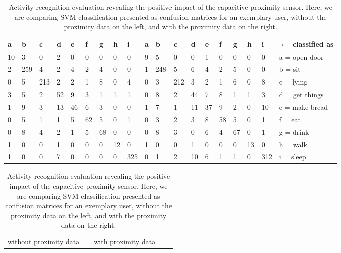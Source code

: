 \documentclass[runningheads,a4paper]{llncs}
\begin{document}
\begin{table}[htbp]
	\centering	\begin{tabular}{p{0.48cm}p{0.48cm}p{0.48cm}p{0.48cm}p{0.48cm}p{0.48cm}p{0.48cm}p{0.48cm}p{0.48cm}|p{0.48cm}p{0.48cm}p{0.48cm}p{0.48cm}p{0.48cm}p{0.48cm}p{0.48cm}p{0.48cm}p{0.48cm}|p{2.2cm}}
a & b & c & d & e & f & g & h & i & a & b & c & d & e & f & g & h & i & $\leftarrow$ classified as\\
\hline
10 & 3 & 0 & 2 & 0 & 0 & 0 & 0 & 0 		& 9 & 5 & 0 & 0 & 1 & 0 & 0 & 0 & 0 & a = open door\\
\hline
2 & 259 & 4 & 2 & 4 & 2 & 4 & 0 & 0 	& 1 & 248 & 5 & 6 & 4 & 2 & 5 & 0 & 0 & b = sit\\
\hline
0 & 5 & 213 & 2 & 2 & 1 & 8 & 0 & 4 	& 0 & 3 & 212 & 3 & 2 & 1 & 6 & 0 & 8 & c = lying\\
\hline
3 & 5 & 2 & 52 & 9 & 3 & 1 & 1 & 1 		& 0 & 8 & 2 & 44 & 7 & 8 & 1 & 1 & 3 & d = get things\\
\hline
1 & 9 & 3 & 13 & 46 & 6 & 3 & 0 & 0 	& 1 & 7 & 1 & 11 & 37 & 9 & 2 & 0 & 10 & e = make bread\\
\hline
0 & 5 & 1 & 1 & 5 & 62 & 5 & 0 & 1 		& 0 & 3 & 2 & 3 & 8 & 58 & 5 & 0 & 1 & f = eat\\
\hline
0 & 8 & 4 & 2 & 1 & 5 & 68 & 0 & 0 		& 0 & 8 & 3 & 0 & 6 & 4 & 67 & 0 & 1 & g = drink\\
\hline
1 & 0 & 0 & 1 & 0 & 0 & 0 & 12 & 0 		& 1 & 0 & 0 & 1 & 0 & 0 & 0 & 13 & 0 & h = walk\\
\hline
1 & 0 & 0 & 7 & 0 & 0 & 0 & 0 & 325 	& 0 & 1 & 2 & 10 & 6 & 1 & 1 & 0 & 312 & i = sleep\\
		\end{tabular}
	\caption{Activity recognition evaluation revealing the positive impact of the capacitive proximity sensor. Here, we are comparing SVM classification presented as confusion matrices for an exemplary user, without the proximity data on the left, and with the proximity data on the right.}
	
	\setlength{\tabcolsep}{2.4pt}
	\centering
	
	\begin{scriptsize}
	\begin{tabular}%
	{|ccccccccc|p{0.01cm}|ccccccccc|p{0.01cm}|l}
		\multicolumn{9}{c}{without proximity data} &\multicolumn{1}{c}{}& 
			\multicolumn{9}{c}{with proximity data} &\multicolumn{1}{c}{}&  \\ \cmidrule{1-9} \cmidrule{11-19} 
			

\end{tabular}
\end{scriptsize}
\end{table}
\end{document}
